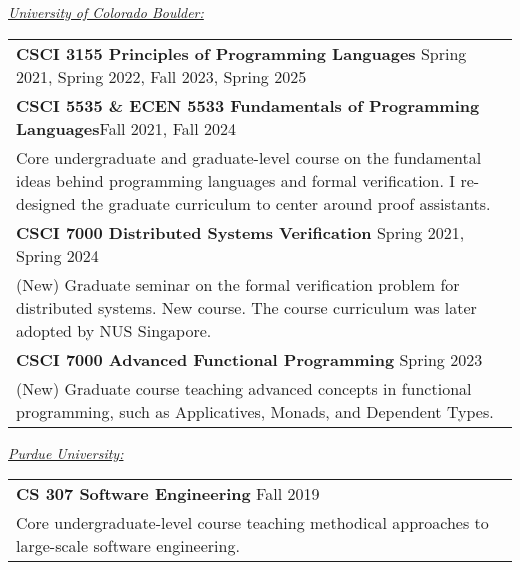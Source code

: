 \documentclass{article}
\begin{document}
\newpage
{}

\vspace{1em}
\noindent \underline{{\em University of Colorado Boulder:}}
\begin{center}
  \begin{tabular}{ p{16.5cm}}
{\bf CSCI 3155 Principles of Programming Languages} \hfill
Spring 2021, Spring 2022, Fall 2023, Spring 2025 \\[3pt]
{\bf CSCI 5535 \& ECEN 5533 Fundamentals of Programming Languages}\hfill Fall 2021, Fall 2024 \\[3pt]
\hspace{2em}  Core undergraduate and graduate-level course on the
fundamental ideas behind programming languages and formal verification. I
re-designed the graduate curriculum to center around proof assistants.\\ [7pt]
%
{\bf CSCI 7000 Distributed Systems Verification} \hfill Spring 2021, Spring
2024 \\[3pt]
\hspace{2em} (New) Graduate seminar on the formal verification problem for
distributed systems. New course. The course curriculum was later
adopted by NUS Singapore.\\ [7pt] 
%
{\bf CSCI 7000 Advanced Functional Programming} \hfill Spring 2023\\[3pt]
\hspace{2em} (New) Graduate course teaching advanced concepts in functional
programming, such as Applicatives, Monads, and Dependent Types. \\ [7pt] 
\end{tabular}
\end{center}
\vspace{0.3em}
\noindent \underline{\em Purdue University:}
\begin{center}
  \begin{tabular}{ p{16.5cm}}
{\bf CS 307 Software Engineering} \hfill Fall 2019 \\[3pt]
\hspace{2em}  Core undergraduate-level course teaching methodical
approaches to large-scale software engineering.  \\ [6pt]
  \end{tabular}
\end{center}
\end{document}
